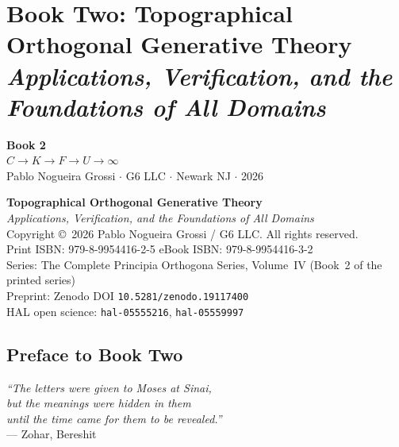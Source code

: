 \documentclass[11pt, twoside, openright]{book}
\theoremstyle{plain}
\theoremstyle{definition}
\begin{document}
\cleardoublepage

\part{Book Two: Topographical Orthogonal Generative Theory\\[6pt]
\large\normalfont\itshape Applications, Verification, and the Foundations of All Domains}

\thispagestyle{empty}
\begin{center}
{\large\bfseries\color{PrincipiaDark} Book 2}\\[8pt]
$C \longrightarrow K \longrightarrow F \longrightarrow U \longrightarrow \infty$\\[16pt]
{\normalsize Pablo Nogueira Grossi $\cdot$ G6 LLC $\cdot$ Newark NJ $\cdot$ 2026}
\end{center}
\cleardoublepage

{\small
\noindent\textbf{Topographical Orthogonal Generative Theory}\\
\textit{Applications, Verification, and the Foundations of All Domains}\\[4pt]
Copyright \copyright\ 2026 Pablo Nogueira Grossi / G6 LLC.
All rights reserved.\\[4pt]
Print ISBN: 979-8-9954416-2-5 \quad eBook ISBN: 979-8-9954416-3-2\\
Series: The Complete Principia Orthogona Series, Volume~IV
(Book~2 of the printed series)\\[4pt]
Preprint: Zenodo DOI \texttt{10.5281/zenodo.19117400}\\
HAL open science: \texttt{hal-05555216}, \texttt{hal-05559997}
}
\cleardoublepage

\chapter*{Preface to Book Two}

\begin{flushright}
\textit{``The letters were given to Moses at Sinai,\\
but the meanings were hidden in them\\
until the time came for them to be revealed.''}\\
--- Zohar, Bereshit
\end{flushright}
\end{document}
